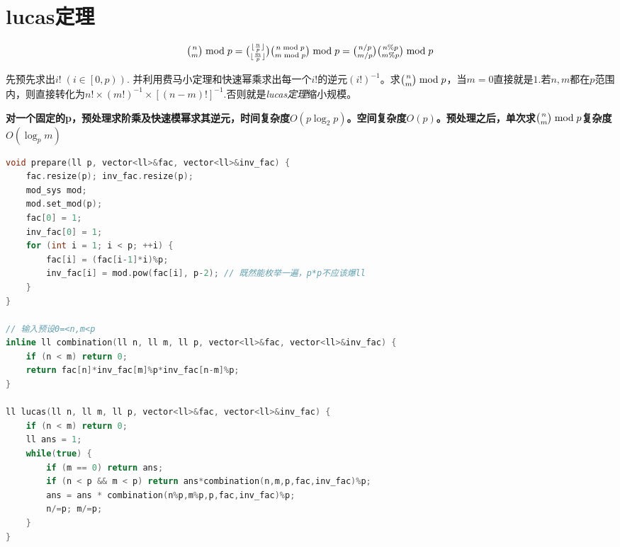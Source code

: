 \section{lucas定理}
    \par $$\tbinom{n}{m} \bmod p = \tbinom{\lfloor \frac{n}{p} \rfloor}{\lfloor \frac{m}{p} \rfloor} \tbinom{n \bmod p}{m \bmod p} \bmod p=\tbinom{n/p}{m/p}\tbinom{n\%p}{m\%p} \bmod p$$  
    \par 先预先求出$i! \;(i \in \left[0,p\right))$. 并利用费马小定理和快速幂乘求出每一个$i!$的逆元$(i!)^{-1}$。求$\tbinom{n}{m} \bmod p$，当$m=0$直接就是$1$.若$n,m$都在$p$范围内，则直接转化为$n! \times (m!)^{-1} \times [(n-m)!]^{-1}$.否则就是\textit{lucas定理}缩小规模。
    \par {\bfseries 对一个固定的p，预处理求阶乘及快速模幂求其逆元，时间复杂度$O(p\log_2{p})$。空间复杂度$O(p)$。预处理之后，单次求$\tbinom{n}{m} \bmod p$复杂度$O(\log_{p}{m})$} 
    \begin{lstlisting}[language={c++}]
void prepare(ll p, vector<ll>&fac, vector<ll>&inv_fac) {
    fac.resize(p); inv_fac.resize(p);
    mod_sys mod;
    mod.set_mod(p);
    fac[0] = 1;
    inv_fac[0] = 1;
    for (int i = 1; i < p; ++i) {
        fac[i] = (fac[i-1]*i)%p;
        inv_fac[i] = mod.pow(fac[i], p-2); // 既然能枚举一遍，p*p不应该爆ll
    }
}

// 输入预设0=<n,m<p
inline ll combination(ll n, ll m, ll p, vector<ll>&fac, vector<ll>&inv_fac) {
    if (n < m) return 0;
    return fac[n]*inv_fac[m]%p*inv_fac[n-m]%p;
}

ll lucas(ll n, ll m, ll p, vector<ll>&fac, vector<ll>&inv_fac) {
    if (n < m) return 0;
    ll ans = 1;
    while(true) {
        if (m == 0) return ans;
        if (n < p && m < p) return ans*combination(n,m,p,fac,inv_fac)%p;
        ans = ans * combination(n%p,m%p,p,fac,inv_fac)%p;
        n/=p; m/=p;
    }
}
    \end{lstlisting}